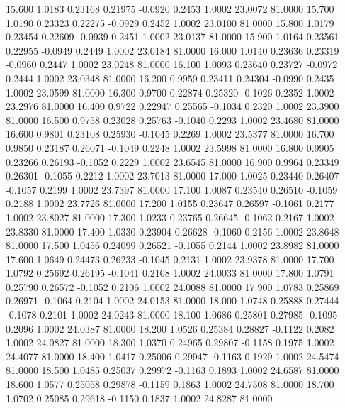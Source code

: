   15.600   1.0183   0.23168   0.21975  -0.0920   0.2453   1.0002  23.0072  81.0000
  15.700   1.0190   0.23323   0.22275  -0.0929   0.2452   1.0002  23.0100  81.0000
  15.800   1.0179   0.23454   0.22609  -0.0939   0.2451   1.0002  23.0137  81.0000
  15.900   1.0164   0.23561   0.22955  -0.0949   0.2449   1.0002  23.0184  81.0000
  16.000   1.0140   0.23636   0.23319  -0.0960   0.2447   1.0002  23.0248  81.0000
  16.100   1.0093   0.23640   0.23727  -0.0972   0.2444   1.0002  23.0348  81.0000
  16.200   0.9959   0.23411   0.24304  -0.0990   0.2435   1.0002  23.0599  81.0000
  16.300   0.9700   0.22874   0.25320  -0.1026   0.2352   1.0002  23.2976  81.0000
  16.400   0.9722   0.22947   0.25565  -0.1034   0.2320   1.0002  23.3900  81.0000
  16.500   0.9758   0.23028   0.25763  -0.1040   0.2293   1.0002  23.4680  81.0000
  16.600   0.9801   0.23108   0.25930  -0.1045   0.2269   1.0002  23.5377  81.0000
  16.700   0.9850   0.23187   0.26071  -0.1049   0.2248   1.0002  23.5998  81.0000
  16.800   0.9905   0.23266   0.26193  -0.1052   0.2229   1.0002  23.6545  81.0000
  16.900   0.9964   0.23349   0.26301  -0.1055   0.2212   1.0002  23.7013  81.0000
  17.000   1.0025   0.23440   0.26407  -0.1057   0.2199   1.0002  23.7397  81.0000
  17.100   1.0087   0.23540   0.26510  -0.1059   0.2188   1.0002  23.7726  81.0000
  17.200   1.0155   0.23647   0.26597  -0.1061   0.2177   1.0002  23.8027  81.0000
  17.300   1.0233   0.23765   0.26645  -0.1062   0.2167   1.0002  23.8330  81.0000
  17.400   1.0330   0.23904   0.26628  -0.1060   0.2156   1.0002  23.8648  81.0000
  17.500   1.0456   0.24099   0.26521  -0.1055   0.2144   1.0002  23.8982  81.0000
  17.600   1.0649   0.24473   0.26233  -0.1045   0.2131   1.0002  23.9378  81.0000
  17.700   1.0792   0.25692   0.26195  -0.1041   0.2108   1.0002  24.0033  81.0000
  17.800   1.0791   0.25790   0.26572  -0.1052   0.2106   1.0002  24.0088  81.0000
  17.900   1.0783   0.25869   0.26971  -0.1064   0.2104   1.0002  24.0153  81.0000
  18.000   1.0748   0.25888   0.27444  -0.1078   0.2101   1.0002  24.0243  81.0000
  18.100   1.0686   0.25801   0.27985  -0.1095   0.2096   1.0002  24.0387  81.0000
  18.200   1.0526   0.25384   0.28827  -0.1122   0.2082   1.0002  24.0827  81.0000
  18.300   1.0370   0.24965   0.29807  -0.1158   0.1975   1.0002  24.4077  81.0000
  18.400   1.0417   0.25006   0.29947  -0.1163   0.1929   1.0002  24.5474  81.0000
  18.500   1.0485   0.25037   0.29972  -0.1163   0.1893   1.0002  24.6587  81.0000
  18.600   1.0577   0.25058   0.29878  -0.1159   0.1863   1.0002  24.7508  81.0000
  18.700   1.0702   0.25085   0.29618  -0.1150   0.1837   1.0002  24.8287  81.0000
